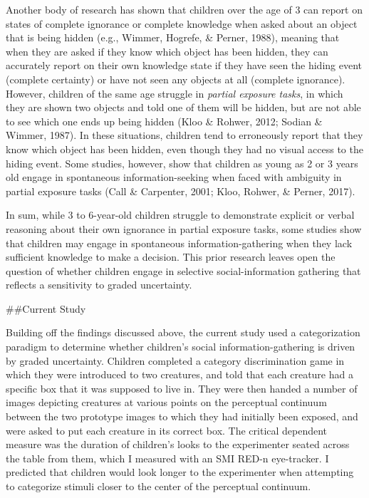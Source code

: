 \documentclass[,man,floatsintext]{apa6}
\begin{document}
Another body of research has shown that children over the age of 3 can report on states of complete ignorance or complete knowledge when asked about an object that is being hidden (e.g., Wimmer, Hogrefe, \& Perner, 1988), meaning that when they are asked if they know which object has been hidden, they can accurately report on their own knowledge state if they have seen the hiding event (complete certainty) or have not seen any objects at all (complete ignorance). However, children of the same age struggle in \emph{partial exposure tasks}, in which they are shown two objects and told one of them will be hidden, but are not able to see which one ends up being hidden (Kloo \& Rohwer, 2012; Sodian \& Wimmer, 1987). In these situations, children tend to erroneously report that they know which object has been hidden, even though they had no visual access to the hiding event. Some studies, however, show that children as young as 2 or 3 years old engage in spontaneous information-seeking when faced with ambiguity in partial exposure tasks (Call \& Carpenter, 2001; Kloo, Rohwer, \& Perner, 2017).

In sum, while 3 to 6-year-old children struggle to demonstrate explicit or verbal reasoning about their own ignorance in partial exposure tasks, some studies show that children may engage in spontaneous information-gathering when they lack sufficient knowledge to make a decision. This prior research leaves open the question of whether children engage in selective social-information gathering that reflects a sensitivity to graded uncertainty.

\#\#Current Study

Building off the findings discussed above, the current study used a categorization paradigm to determine whether children's social information-gathering is driven by graded uncertainty. Children completed a category discrimination game in which they were introduced to two creatures, and told that each creature had a specific box that it was supposed to live in. They were then handed a number of images depicting creatures at various points on the perceptual continuum between the two prototype images to which they had initially been exposed, and were asked to put each creature in its correct box. The critical dependent measure was the duration of children's looks to the experimenter seated across the table from them, which I measured with an SMI RED-n eye-tracker. I predicted that children would look longer to the experimenter when attempting to categorize stimuli closer to the center of the perceptual continuum.
\end{document}
